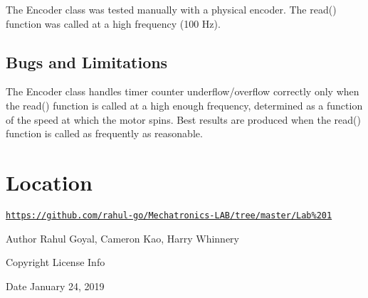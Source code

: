 The Encoder class was tested manually with a physical encoder. The read() function was called at a high frequency (100 Hz).\hypertarget{index_bugs_and_limitations}{}\subsection{Bugs and Limitations}\label{index_bugs_and_limitations}
The Encoder class handles timer counter underflow/overflow correctly only when the read() function is called at a high enough frequency, determined as a function of the speed at which the motor spins. Best results are produced when the read() function is called as frequently as reasonable.\hypertarget{index_location}{}\section{Location}\label{index_location}
\href{https://github.com/rahul-go/Mechatronics-LAB/tree/master/Lab%201}{\tt https\+://github.\+com/rahul-\/go/\+Mechatronics-\/\+L\+A\+B/tree/master/\+Lab\%201}

\begin{DoxyAuthor}{Author}
Rahul Goyal, Cameron Kao, Harry Whinnery
\end{DoxyAuthor}
\begin{DoxyCopyright}{Copyright}
License Info
\end{DoxyCopyright}
\begin{DoxyDate}{Date}
January 24, 2019 
\end{DoxyDate}
